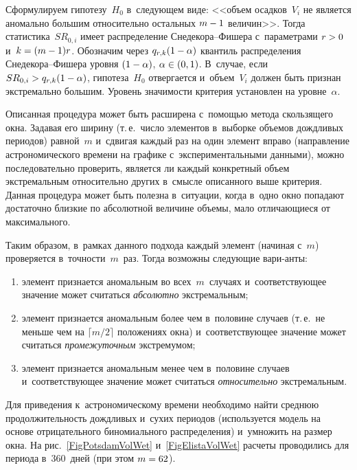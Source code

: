 \begin{multicols}{2}
Сформулируем гипотезу~$H_0$ в~следующем виде: <<объем осадков~$V_i$ 
не является аномально большим относительно остальных $m\hm-1$ величин>>.
 Тогда статистика~$SR_{0,i}$ имеет распределение Сне\-де\-ко\-ра--Фи\-ше\-ра 
 с~параметрами $r\hm>0$ и~$k\hm=(m\hm-1)r$. Обозначим через $q_{r,k}(1\hm-\alpha)$ 
 квантиль распределения Сне\-де\-ко\-ра--Фи\-ше\-ра уровня $(1\hm-\alpha)$, 
 $\alpha\hm\in(0,1)$. В~случае, если $SR_{0,i}\hm>q_{r,k}(1\hm-\alpha)$, гипотеза~$H_0$ 
 отвергается и~объем~$V_i$ должен быть признан экстремально большим. 
 Уровень значимости критерия установлен на уровне~$\alpha$.

Описанная процедура может быть расширена с~помощью метода скользящего окна. 
Задавая его ширину (т.\,е.\ число элементов в~выборке объемов дождливых периодов) 
равной~$m$ и~сдвигая каждый\linebreak
 раз на один элемент вправо (направление астрономического 
времени на графике с~экспериментальными данными), можно последовательно проверить, 
является ли каждый конкретный объем экстремаль\-ным относительно других в~смысле 
описанного выше критерия. Данная процедура может быть полезна в~ситуации, 
когда в~одно окно попадают достаточно близкие по абсолютной величине объемы, 
мало отличающиеся от максимального. 

Таким образом, в~рамках данного подхода 
каж\-дый элемент (начиная с~$m$) проверяется в~точ\-ности~$m$~раз. Тогда возможны 
сле\-ду\-ющие вари-\linebreak анты:\\[-15pt]
\begin{enumerate}[(1)]
\item элемент признается аномальным во всех~$m$~случаях 
и~соответствующее значение может считаться \textit{абсолютно} экстремальным;
\item 
элемент признается аномальным более чем в~половине случаев (т.\,е.\ 
не меньше чем на $\lceil  m/2\rceil$ положениях окна)  и~соответствующее значение 
может считаться \textit{промежуточным} экстремумом; 
\item элемент признается 
аномальным менее чем в~половине случаев и~соответствующее значение может 
считаться \textit{относительно} экстремальным.
\end{enumerate}

 Для приведения к~астрономическому 
времени необходимо найти среднюю продолжительность дождливых и~сухих периодов 
(используется модель на основе отрицательного биномиального распределения) и~умножить 
на размер окна. На рис.~\ref{FigPotsdamVolWet} и~\ref{FigElistaVolWet} 
расчеты проводились для периода в~360~дней (при этом $m\hm=62$).


\end{multicols}
